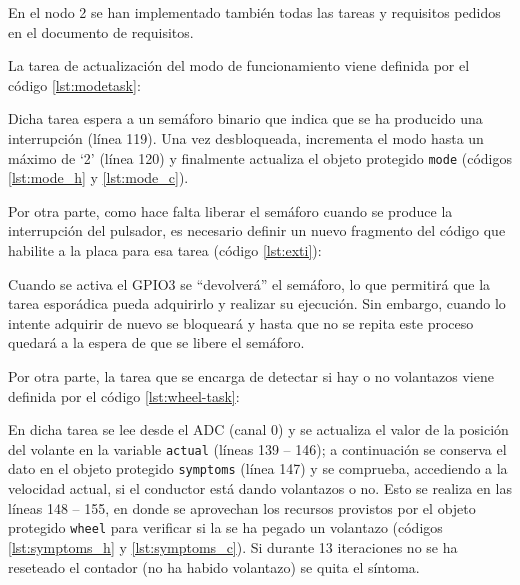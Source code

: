 En el nodo 2 se han implementado también todas las tareas y requisitos pedidos
en el documento de requisitos.

La tarea de actualización del modo de funcionamiento viene definida por el código
\ref{lst:modetask}:



Dicha tarea espera a un semáforo binario que indica que se ha producido una interrupción
(línea 119). Una vez desbloqueada, incrementa el modo hasta un máximo de `2' (línea 120)
y finalmente actualiza el objeto protegido \texttt{mode} (códigos \ref{lst:mode_h} y
\ref{lst:mode_c}).

Por otra parte, como hace falta liberar el semáforo cuando se produce la interrupción
del pulsador, es necesario definir un nuevo fragmento del código que habilite a la
placa para esa tarea (código \ref{lst:exti}):



Cuando se activa el GPIO3 se ``devolverá'' el semáforo, lo que permitirá que la tarea
esporádica pueda adquirirlo y realizar su ejecución. Sin embargo, cuando lo intente
adquirir de nuevo se bloqueará y hasta que no se repita este proceso quedará a la
espera de que se libere el semáforo.

Por otra parte, la tarea que se encarga de detectar si hay o no volantazos viene definida
por el código \ref{lst:wheel-task}:



En dicha tarea se lee desde el ADC (canal 0) y se actualiza el valor de la posición
del volante en la variable \texttt{actual} (líneas 139 -- 146); a continuación se
conserva el dato en el objeto protegido \texttt{symptoms} (línea 147) y se comprueba,
accediendo a la velocidad actual, si el conductor está dando volantazos o no. Esto se
realiza en las líneas 148 -- 155, en donde se aprovechan los recursos provistos por
el objeto protegido \texttt{wheel} para verificar si la se ha pegado un volantazo
(códigos \ref{lst:symptoms_h} y \ref{lst:symptoms_c}). Si durante 13 iteraciones no se ha
reseteado el contador (no ha habido volantazo) se quita el síntoma.


